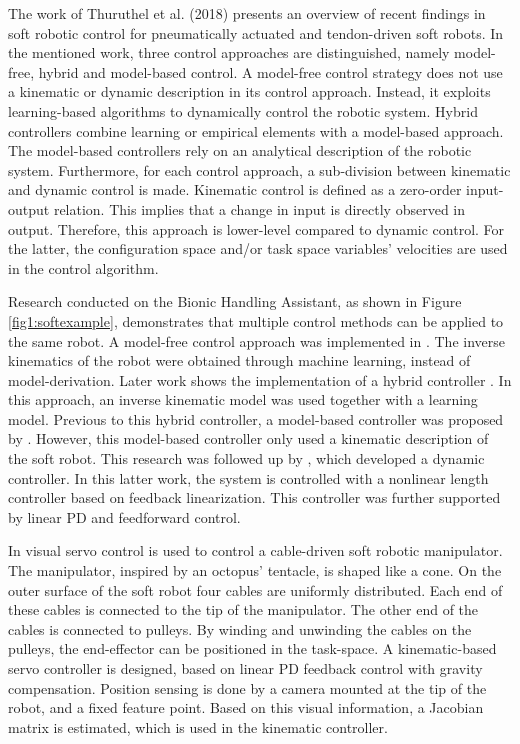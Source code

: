The work of Thuruthel et al. (2018) \cite{george2018control} presents an overview of recent findings in soft robotic control for pneumatically actuated and tendon-driven soft robots. In the mentioned work, three control approaches are distinguished, namely model-free, hybrid and model-based control. A model-free control strategy does not use a kinematic or dynamic description in its control approach. Instead, it exploits learning-based algorithms to dynamically control the robotic system. Hybrid controllers combine learning or empirical elements with a model-based approach. The model-based controllers rely on an analytical description of the robotic system. Furthermore, for each control approach, a sub-division between kinematic and dynamic control is made. Kinematic control is defined as a zero-order input-output relation. This implies that a change in input is directly observed in output. Therefore, this approach is lower-level compared to dynamic control. For the latter, the configuration space and/or task space variables' velocities are used in the control algorithm. 


Research conducted on the Bionic Handling Assistant, as shown in Figure \ref{fig1:softexample}, demonstrates that multiple control methods can be applied to the same robot. A model-free control approach was implemented in \cite{rolf2013efficient}. The inverse kinematics of the robot were obtained through machine learning, instead of model-derivation. Later work shows the implementation of a hybrid controller \cite{reinhart2017hybrid}. In this approach, an inverse kinematic model was used together with a learning model. Previous to this hybrid controller, a model-based controller was proposed by \cite{mahl2014bhakin}. However, this model-based controller only used a kinematic description of the soft robot. This research was followed up by \cite{falkenhahn2016dynamic}, which developed a dynamic controller. In this latter work, the system is controlled with a nonlinear length controller based on feedback linearization. This controller was further supported by linear PD and feedforward control. 

In \cite{wang2013visual} visual servo control is used to control a cable-driven soft robotic manipulator. The manipulator, inspired by an octopus' tentacle, is shaped like a cone. On the outer surface of the soft robot four cables are uniformly distributed. Each end of these cables is connected to the tip of the manipulator. The other end of the cables is connected to pulleys. By winding and unwinding the cables on the pulleys, the end-effector can be positioned in the task-space. A kinematic-based servo controller is designed, based on linear PD feedback control with gravity compensation. Position sensing is done by a camera mounted at the tip of the robot, and a fixed feature point. Based on this visual information, a Jacobian matrix is estimated, which is used in the kinematic controller.

